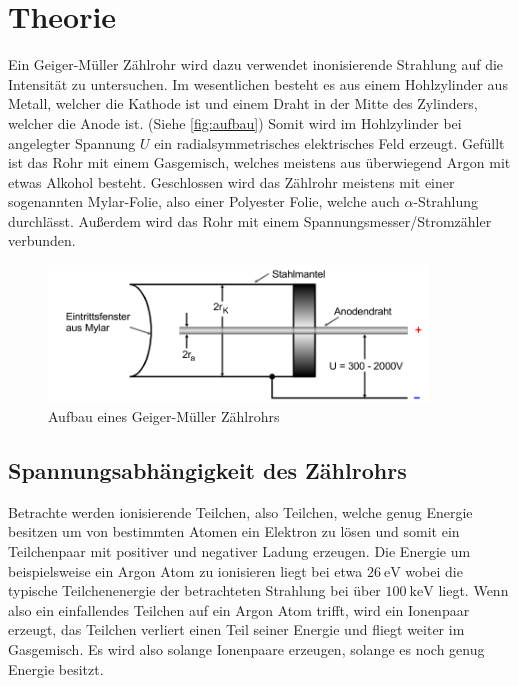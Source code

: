 \section{Theorie}
\label{sec:Theorie}

Ein Geiger-Müller Zählrohr wird dazu verwendet inonisierende Strahlung auf die Intensität zu untersuchen.
Im wesentlichen besteht es aus einem Hohlzylinder aus Metall, welcher die Kathode ist und einem Draht in der Mitte des Zylinders, welcher die Anode ist. (Siehe \autoref{fig:aufbau})
Somit wird im Hohlzylinder bei angelegter Spannung $U$ ein radialsymmetrisches elektrisches Feld erzeugt.
Gefüllt ist das Rohr mit einem Gasgemisch, welches meistens aus überwiegend Argon mit etwas Alkohol besteht.
Geschlossen wird das Zählrohr meistens mit einer sogenannten Mylar-Folie, also einer Polyester Folie, welche auch $\alpha$-Strahlung durchlässt.
Außerdem wird das Rohr mit einem Spannungsmesser/Stromzähler verbunden.

\begin{figure}
    \centering
    \includegraphics[width=0.9\textwidth]{images/skizze_0.png}
    \caption{Aufbau eines Geiger-Müller Zählrohrs\cite{V703}}
    \label{fig:aufbau}
\end{figure}

\subsection{Spannungsabhängigkeit des Zählrohrs}
\label{ssec:wirkungsweise}

Betrachte werden ionisierende Teilchen, also Teilchen, welche genug Energie besitzen um von bestimmten Atomen ein Elektron zu lösen und somit ein Teilchenpaar mit positiver und negativer Ladung erzeugen.
Die Energie um beispielsweise ein Argon Atom zu ionisieren liegt bei etwa $\SI{26}{\electronvolt}$ wobei die typische Teilchenenergie der betrachteten Strahlung bei über $\SI{100}{\kilo\electronvolt}$ liegt.
Wenn also ein einfallendes Teilchen auf ein Argon Atom trifft, wird ein Ionenpaar erzeugt, das Teilchen verliert einen Teil seiner Energie und fliegt weiter im Gasgemisch.
Es wird also solange Ionenpaare erzeugen, solange es noch genug Energie besitzt.

